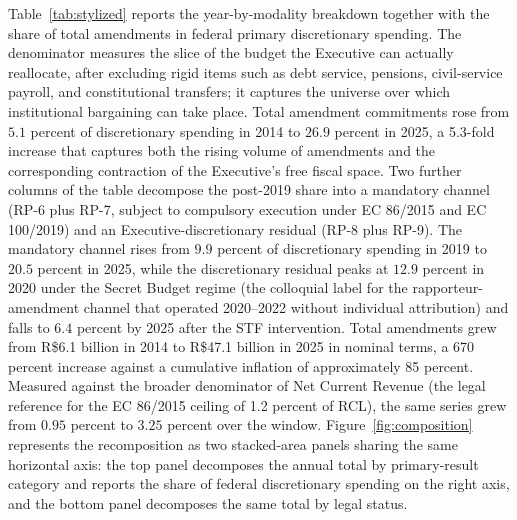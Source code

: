\documentclass[preprint,12pt,authoryear]{elsarticle}
\begin{document}
Table~\ref{tab:stylized} reports the year-by-modality breakdown together with the share of total amendments in federal primary discretionary spending. The denominator measures the slice of the budget the Executive can actually reallocate, after excluding rigid items such as debt service, pensions, civil-service payroll, and constitutional transfers; it captures the universe over which institutional bargaining can take place. Total amendment commitments rose from $5.1$ percent of discretionary spending in 2014 to $26.9$ percent in 2025, a 5.3-fold increase that captures both the rising volume of amendments and the corresponding contraction of the Executive's free fiscal space. Two further columns of the table decompose the post-2019 share into a mandatory channel (RP-6 plus RP-7, subject to compulsory execution under EC 86/2015 and EC 100/2019) and an Executive-discretionary residual (RP-8 plus RP-9). The mandatory channel rises from $9.9$ percent of discretionary spending in 2019 to $20.5$ percent in 2025, while the discretionary residual peaks at $12.9$ percent in 2020 under the Secret Budget regime (the colloquial label for the rapporteur-amendment channel that operated 2020--2022 without individual attribution) and falls to $6.4$ percent by 2025 after the STF intervention. Total amendments grew from R\$6.1 billion in 2014 to R\$47.1 billion in 2025 in nominal terms, a 670 percent increase against a cumulative inflation of approximately 85 percent. Measured against the broader denominator of Net Current Revenue (the legal reference for the EC 86/2015 ceiling of 1.2 percent of RCL), the same series grew from $0.95$ percent to $3.25$ percent over the window. Figure~\ref{fig:composition} represents the recomposition as two stacked-area panels sharing the same horizontal axis: the top panel decomposes the annual total by primary-result category and reports the share of federal discretionary spending on the right axis, and the bottom panel decomposes the same total by legal status.
\end{document}
